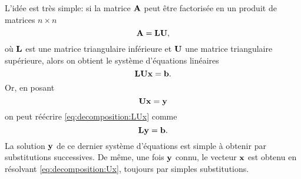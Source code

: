 L'idée est très simple: si la matrice $\mathbf{A}$ peut être factorisée
en un produit de matrices $n \times n$
\begin{displaymath}
  \mathbf{A} = \mathbf{L} \mathbf{U},
\end{displaymath}
où $\mathbf{L}$ est une matrice triangulaire inférieure et $\mathbf{U}$ une
matrice triangulaire supérieure, alors on obtient le système
d'équations linéaires
\begin{equation}
  \mathbf{L} \mathbf{U} \mathbf{x} = \mathbf{b}.
  \label{eq:decomposition:LUx}
\end{equation}
Or, en posant
\begin{equation}
  \mathbf{U} \mathbf{x} = \mathbf{y}
  \label{eq:decomposition:Ux}
\end{equation}
on peut réécrire \eqref{eq:decomposition:LUx} comme
\begin{equation}
  \mathbf{L} \mathbf{y} = \mathbf{b}.
\end{equation}
La solution $\mathbf{y}$ de ce dernier système d'équations est simple à
obtenir par substitutions successives. De même, une fois $\mathbf{y}$
connu, le vecteur $\mathbf{x}$ est obtenu en résolvant
\eqref{eq:decomposition:Ux}, toujours par simples substitutions.

